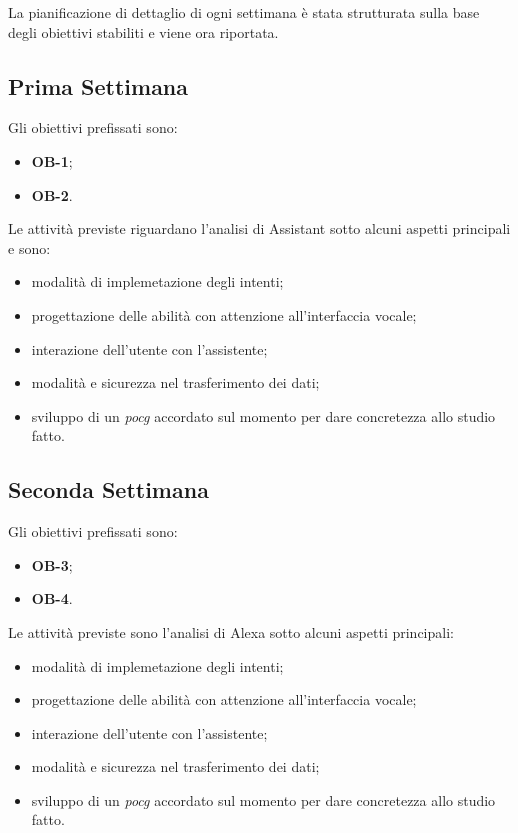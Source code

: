 La pianificazione di dettaglio di ogni settimana è stata strutturata sulla base degli obiettivi stabiliti e viene ora riportata.
	\subsection*{Prima Settimana}
	Gli obiettivi prefissati sono:
	\begin{itemize}
		\item \textbf{OB-1};
		\item \textbf{OB-2}.
	\end{itemize}
	Le attività previste riguardano l'analisi di Assistant sotto alcuni aspetti principali e sono:
	\begin{itemize}
		\item modalità di implemetazione degli intenti;
		\item progettazione delle abilità con attenzione all'interfaccia vocale;
		\item interazione dell'utente con l'assistente;
		\item modalità e sicurezza nel trasferimento dei dati;
		\item sviluppo di un \emph{\gls{pocg}} accordato sul momento per dare concretezza allo studio fatto.
	\end{itemize}
	\subsection*{Seconda Settimana}
	Gli obiettivi prefissati sono:
	\begin{itemize}
		\item \textbf{OB-3};
		\item \textbf{OB-4}.
	\end{itemize}
	Le attività previste sono l'analisi di Alexa sotto alcuni aspetti principali:
	\begin{itemize}
		\item modalità di implemetazione degli intenti;
		\item progettazione delle abilità con attenzione all'interfaccia vocale;
		\item interazione dell'utente con l'assistente;
		\item modalità e sicurezza nel trasferimento dei dati;
		\item sviluppo di un \emph{\gls{pocg}} accordato sul momento per dare concretezza allo studio fatto.
	\end{itemize}
